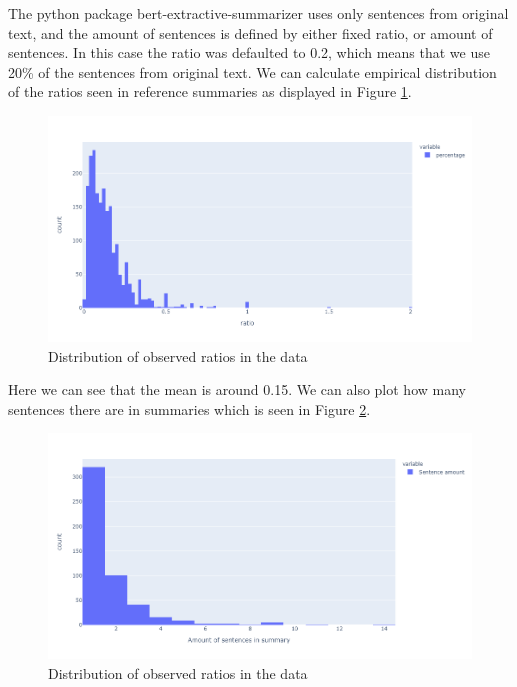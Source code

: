 \documentclass{article}
\begin{document}
\noindent
The python package bert-extractive-summarizer \cite{extractive_bert} uses only sentences from original text, and the amount of sentences is defined by either fixed ratio, or amount of sentences. In this case the ratio was defaulted to 0.2, which means that we use 20\% of the sentences from original text. We can calculate empirical distribution of the ratios seen in reference summaries as displayed in Figure \ref{fig:empirical_ratio}.


\noindent
\begin{figure}[H]
	\centering
	\hspace*{-3cm}
	\includegraphics[scale=0.55]{empirical_ratio.png}
	\caption{Distribution of observed ratios in the data}
	\label{fig:empirical_ratio}
\end{figure}

\noindent
Here we can see that the mean is around 0.15. We can also plot how many sentences there are in summaries which is seen in Figure \ref{fig:empirical_lengths}.

\noindent
\begin{figure}[H]
	\centering
	\hspace*{-3cm}
	\includegraphics[scale=0.55]{empirical_lengths.png}
	\caption{Distribution of observed ratios in the data}
	\label{fig:empirical_lengths}
\end{figure}
\end{document}
